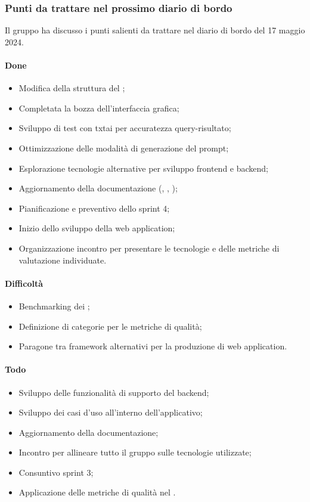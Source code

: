 \subsubsection{Punti da trattare nel prossimo diario di bordo}
\par Il gruppo ha discusso i punti salienti da trattare nel diario di bordo del 17 maggio 2024.
\paragraph{Done}
\begin{itemize}
	\item Modifica della struttura del \PdP;
	\item Completata la bozza dell'interfaccia grafica;
	\item Sviluppo di test con txtai per accuratezza query-risultato;
	\item Ottimizzazione delle modalità di generazione del prompt;
	\item Esplorazione tecnologie alternative per sviluppo frontend e backend;
	\item Aggiornamento della documentazione (\PdQ, \NdP, \AdR);
	\item Pianificazione e preventivo dello sprint 4;
	\item Inizio dello sviluppo della web application;
	\item Organizzazione incontro per presentare le tecnologie e delle metriche di valutazione individuate.
\end{itemize}
\paragraph{Difficoltà}
\begin{itemize}
	\item Benchmarking dei ;
	\item Definizione di categorie per le metriche di qualità;
	\item Paragone tra framework alternativi per la produzione di web application.
\end{itemize}	
\paragraph{Todo}
\begin{itemize}
	\item Sviluppo delle funzionalità di supporto del backend;
	\item Sviluppo dei casi d'uso all'interno dell'applicativo;
	\item Aggiornamento della documentazione;
	\item Incontro per allineare tutto il gruppo sulle tecnologie utilizzate;
	\item Consuntivo sprint 3;
	\item Applicazione delle metriche di qualità nel \WoW.
\end{itemize}
